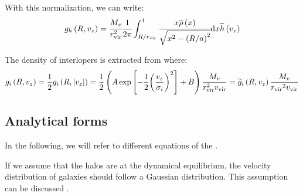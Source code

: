 With this normalization, we can write:
%
\begin{equation}
    g_h \left(R, v_z\right) =\cfrac{M_v}{r_{\rm vir}^2}
    \cfrac{1}{2\pi}
    \int_{R/r_{\rm vir}}^1
    \cfrac{x\overline\rho \left(x\right)}{\sqrt{x^2 -
    {\left(R/a\right)}^2}}{\rm{d}} x \widetilde{h} \left(v_z\right)
\end{equation}

The density of interlopers is extracted from \citet{MBM+10} where:
%
\begin{equation}
    g_i\left(R,v_z\right)=\frac{1}{2} g_i\left(R,|v_z|\right)=
    \frac{1}{2}\left(A
        \exp\left[-\frac{1}{2}{\left(\frac{v_z}{\sigma_i}\right)}^2\right]
    +B\right)\frac{M_v}{r_{\rm vir}^2 v_{\rm vir}}=
    \widetilde g_i\left(R,v_z\right)\frac{M_v}{{r_{\rm{vir}}}^2 v_{\rm{vir}}}
\end{equation}

\subsection{Analytical forms}
\label{sub:analytical_forms}

In the following, we will refer to different equations of the
.

If we assume that the halos are at the dynamical equilibrium, the velocity
distribution of galaxies should follow a Gaussian distribution. This
assumption can be discussed \citep{Beraldo+14}.

